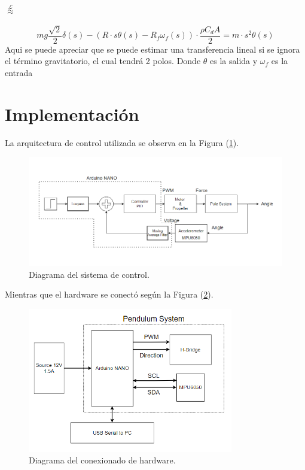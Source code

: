 \begin{huge}
\begin{center}
	$\stackrel{\mathcal{L}}{\approx}$
\end{center}
\end{huge}

\begin{equation}
mg\frac{\sqrt{2}}{2} \delta(s) - \left( R\cdot s\theta(s) - R_f \omega_f(s) \right)\cdot \frac{\rho C_d A}{2} = m\cdot s^2\theta(s)   
\end{equation}
Aqui se puede apreciar que se puede estimar una transferencia lineal si se ignora el término gravitatorio, el cual tendrá 2 polos. Donde $\theta$ es la salida y $\omega_f$ es la entrada

\section{Implementación}

La arquitectura de control utilizada se observa en la Figura (\ref{fig:controlsys}).

\begin{figure}[H]
    \centering
    \includegraphics[width=\textwidth]{./Imagenes/controlsystem.png}
    \caption{Diagrama del sistema de control.}
    \label{fig:controlsys}
\end{figure}


Mientras que el hardware se conectó según la Figura (\ref{fig:hardwaresys}).

\begin{figure}[H]
    \centering
    \includegraphics[width=0.8\textwidth]{./Imagenes/hardwaresystem.png}
    \caption{Diagrama del conexionado de hardware.}
    \label{fig:hardwaresys}
\end{figure}

